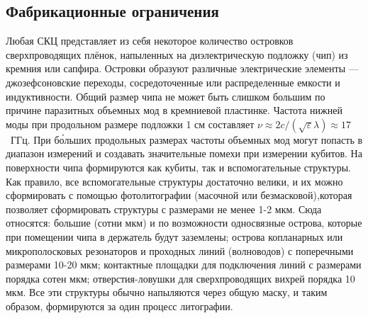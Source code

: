 \subsection{Фабрикационные ограничения}
Любая СКЦ представляет из себя некоторое количество островков сверхпроводящих плёнок, напыленных на диэлектрическую подложку (чип) из кремния или сапфира. Островки образуют различные электрические элементы --- джозефсоновские переходы, сосредоточенные или распределенные емкости и индуктивности. Общий размер чипа не может быть слишком большим по причине паразитных объемных мод в кремниевой пластинке. Частота нижней моды при продольном размере подложки 1 см составляет $\nu\approx2c/(\sqrt{\varepsilon}\lambda)\approx17$~ГГц. При б\'{о}льших продольных размерах частоты объемных мод могут попасть в диапазон измерений и создавать значительные помехи при измерении кубитов. На поверхности чипа формируются как кубиты, так и вспомогательные структуры. Как правило, все вспомогательные структуры достаточно велики, и их можно сформировать с помощью фотолитографии (масочной или безмасковой),которая позволяет сформировать структуры с размерами не менее 1-2 мкм. Сюда относятся: большие (сотни мкм) и по возможности односвязные острова, которые при помещении чипа в держатель будут заземлены; острова копланарных или микрополосковых резонаторов и проходных линий (волноводов) с поперечными размерами 10-20 мкм; контактные площадки для подключения линий с размерами порядка сотен мкм; отверстия-ловушки для сверхпроводящих вихрей порядка 10 мкм. Все эти структуры обычно напыляются через общую маску, и таким образом, формируются за один процесс литографии. 


